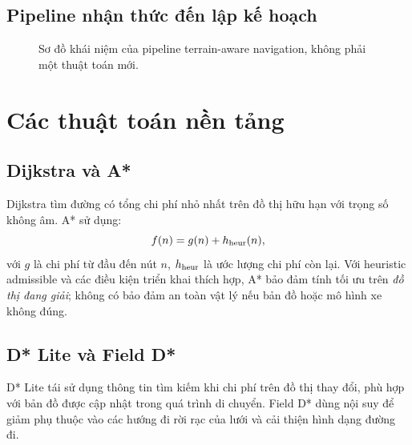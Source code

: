 \documentclass[11pt,a4paper]{article}
\begin{document}
\subsection{Pipeline nhận thức đến lập kế hoạch}
\begin{figure}[htbp]
\centering
{}
\caption{Sơ đồ khái niệm của pipeline terrain-aware navigation,
không phải một thuật toán mới.}
\label{fig:flow}
\end{figure}

\section{Các thuật toán nền tảng}
\subsection{Dijkstra và A*}
Dijkstra tìm đường có tổng chi phí nhỏ nhất trên đồ thị hữu hạn
với trọng số không âm. A* \cite{hart1968formal} sử dụng:
\begin{equation}
 f(n)=g(n)+h_{\rm heur}(n),
\end{equation}
với \(g\) là chi phí từ đầu đến nút \(n\), \(h_{\rm heur}\)
là ước lượng chi phí còn lại. Với heuristic admissible
và các điều kiện triển khai thích hợp, A* bảo đảm tính tối ưu
trên \emph{đồ thị đang giải}; không có bảo đảm an toàn vật lý
nếu bản đồ hoặc mô hình xe không đúng.

\subsection{D* Lite và Field D*}
D* Lite \cite{koenig2002dstarlite} tái sử dụng thông tin tìm kiếm
khi chi phí trên đồ thị thay đổi, phù hợp với bản đồ được cập nhật
trong quá trình di chuyển. Field D* \cite{ferguson2006field}
dùng nội suy để giảm phụ thuộc vào các hướng đi rời rạc
của lưới và cải thiện hình dạng đường đi.
\end{document}
